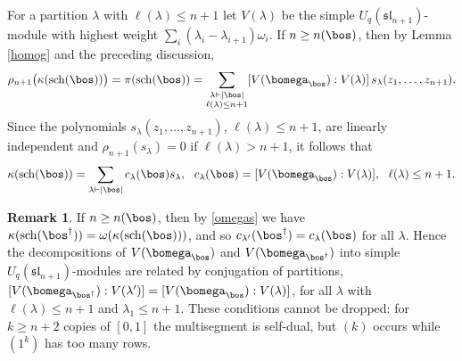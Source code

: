 \documentclass[11pt,reqno]{amsart}
\theoremstyle{definition} \newtheorem*{defn}{Definition}
\theoremstyle{definition}
\newtheorem*{rem}{Remark}
\numberwithin{equation}{section}
\newcommand{\lie}[1]{\mathfrak{#1}}
\begin{document}
\noindent For a partition $\lambda$ with $\ell(\lambda)\le n+1$ let $V(\lambda)$ be the simple $U_q(\lie{sl}_{n+1})$-module with highest weight
$\sum_i(\lambda_i-\lambda_{i+1})\omega_i$. If $n\ge n(\bos)$, then by Lemma \ref{homog} and the preceding discussion,
$$\rho_{n+1}\big(\kappa({\rm sch}(\bos))\big)=\pi({\rm sch}(\bos))=\sum_{\substack{\lambda\vdash|\bos|\\ \ell(\lambda)\le n+1}}[V(\bomega_\bos):V(\lambda)]\,s_\lambda(z_1,\dots,z_{n+1}).$$
Since the polynomials $s_\lambda(z_1,\dots,z_{n+1})$, $\ell(\lambda)\le n+1$, are linearly independent and $\rho_{n+1}(s_\lambda)=0$ if
$\ell(\lambda)>n+1$, it follows that $$\kappa({\rm sch}(\bos))=\sum_{\lambda\vdash|\bos|}c_\lambda(\bos)s_\lambda,\ \ 
c_\lambda(\bos)=[V(\bomega_\bos):V(\lambda)],\ \ \ell(\lambda)\le n+1.$$

\begin{rem}\label{conjpart} If $n\ge n(\bos)$, then by \eqref{omegas} we have $\kappa({\rm sch}(\bos^\dagger))=\omega(\kappa({\rm sch}(\bos)))$, and so $c_{\lambda'}(\bos^\dagger)=c_\lambda(\bos)$ for
all $\lambda$. Hence the decompositions of $V(\bomega_\bos)$ and $V(\bomega_{\bos^\dagger})$ into simple $U_q(\lie{sl}_{n+1})$-modules are
related by conjugation of partitions, $[V(\bomega_{\bos^\dagger}):V(\lambda')]=[V(\bomega_\bos):V(\lambda)]$, for all $\lambda$ with $\ell(\lambda)\le n+1$ and $\lambda_1\le n+1$. These
conditions cannot be dropped: for $k\ge n+2$ copies of $[0,1]$ the multisegment is self-dual, but $(k)$ occurs while $(1^k)$ has too many rows.
\end{rem}
\end{document}

